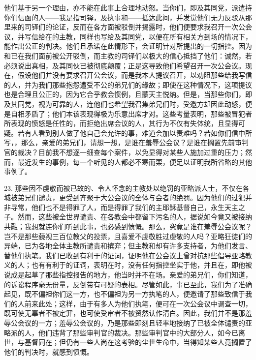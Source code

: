 他们基于另一个理由，亦不能在此事上合理地动怒。当你们，即及其同党，派遣持你们信函的人——我是指司铎，及执事和——抵达此间，并发觉他们无力反驳从那里来的司铎们的论证，反而在各方面被驳倒并揭露时，他们便要求我召开一次公会议，并写信给在的主教，同样也写给及其同党，以便在所有相关方到场的情况下，能作出公正的判决。他们且承诺在此情形下，会证明针对所提出的一切指控。因为和已在我们面前被公开驳倒，而主教的司铎们以极大的信心抵挡了他们：诚然，若必须说出真相，及其同伙已被彻底颠覆；正是这导致他们希望召开一次公会议。现在，假设他们并没有要求召开公会议，而是我本人提议召开，以劝阻那些给我写信的人，并为我们那些抱怨遭受不公的弟兄们的缘故；即使在这种情况下，这项提议也是合理且公正的，因为它合乎教会惯例，且蒙天主悦纳。但是，当那些你们，即及其同党，视为可靠的人，连他们也希望我召集弟兄们时，受邀方却因此动怒，便是自相矛盾了；他们本该表现得极为乐意出席才对。这些考量表明，那些被冒犯者所表现的愤怒是任性的，而拒绝出席会议的人，其行为不仅有失体统，且显得可疑。若有人看到别人做了他自己会允许的事，难道会加以责难吗？若如你们信中所写，，那么，亲爱的弟兄们，请想一想，是谁在羞辱公会议？是谁在搁置先前审判官的裁决？目前我不想逐一细查每个案件，以免显得对某些人施加过重的压力；然而，最近发生的事例，每一个听见的人都必不寒而栗，便足以证明我所省略的其他事例了。\par

23. 那些因不虔敬而被已故的、令人怀念的主教处以绝罚的亚略派人士，不仅在各城被弟兄们谴责，更受到齐聚于大公会议的全体与会者的绝罚。因为他们的过犯并非寻常，他们也不是得罪了人，而是得罪了我们的主耶稣基督自己，永生天主之子。然而，这些被全世界谴责、在各教会中都留下污名的人，据说如今竟又被接纳共融；我想就连你们听到此事，也必感到愤慨。那么，究竟是谁在羞辱公会议呢？岂不是那些藐视三百位教父的投票，且喜爱不虔敬胜过虔敬的人吗？亚略狂徒们的异端，已为各地全体主教所谴责和摈弃；但主教和却有许多支持者，为他们发言、替他们执笔。我们已收到有利于的证词，证明他在公会议上曾对抗那些倡导亚略教义的人；也有有利于的证词，表明在时，没有任何指控坐实于他，并且在，即他被说成是起草了那些指控报告的地方，他当时并不在场。亲爱的弟兄们，你们知道，的诉讼程序毫无份量，反倒带有可疑的表相。尽管如此，事已至此，我们为了准确起见，既不偏袒你们这一方，也不偏袒为另一方执笔的人，便邀请了那些致信于我们的人前来此处；这样，由于有多人为他们执笔，便可在一次公会议中调查一切，既可使无辜者不被定罪，也可使受审者不被贸然认作清白。因此，我们并不是那羞辱公会议的一方；羞辱公会议的，乃是那些即刻且轻率地接纳了已被全体谴责的亚略派的人，他们违背了那些审判官的裁决。那些审判官中的大部分人，如今已离世，与基督同在；但仍有一些人尚在这考验的尘世生命中，当得知某些人竟搁置了他们的判决时，就感到愤慨。\par

